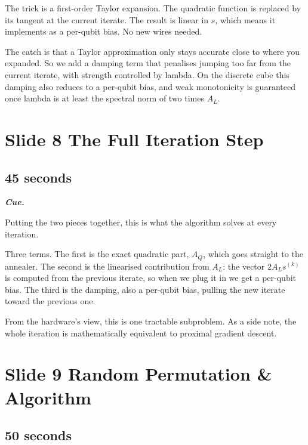 \documentclass[11pt,a4paper]{article}
\newenvironment{cue}{%
  \par\noindent
  \begin{minipage}{\linewidth}
  \color{muted}\small\itshape
  \textbf{\color{accent}\upshape Cue.}~%
}{%
  \end{minipage}\par\medskip
}
\begin{document}
The trick is a first-order Taylor expansion. The quadratic function is replaced by its tangent at the current iterate. The result is linear in $s$, which means it implements as a per-qubit bias. No new wires needed.

The catch is that a Taylor approximation only stays accurate close to where you expanded. So we add a damping term that penalises jumping too far from the current iterate, with strength controlled by lambda. On the discrete cube this damping also reduces to a per-qubit bias, and weak monotonicity is guaranteed once lambda is at least the spectral norm of two times $A_L$.

\section*{Slide 8 \quad The Full Iteration Step}
\subsection*{45 seconds}

\begin{cue}
Putting the two pieces together, this is what the algorithm solves at every iteration.
\end{cue}

Three terms. The first is the exact quadratic part, $A_Q$, which goes straight to the annealer. The second is the linearised contribution from $A_L$: the vector $2 A_L s^{(k)}$ is computed from the previous iterate, so when we plug it in we get a per-qubit bias. The third is the damping, also a per-qubit bias, pulling the new iterate toward the previous one.

From the hardware's view, this is one tractable subproblem. As a side note, the whole iteration is mathematically equivalent to proximal gradient descent.

\section*{Slide 9 \quad Random Permutation \& Algorithm}
\subsection*{50 seconds}
\end{document}

